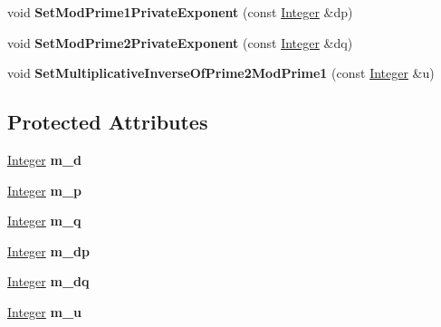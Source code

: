 \begin{DoxyCompactItemize}
\item 
\hypertarget{class_invertible_r_s_a_function_a5b01ca0407225d56dd1f06634d56e405}{
void {\bfseries SetModPrime1PrivateExponent} (const \hyperlink{class_integer}{Integer} \&dp)}
\label{class_invertible_r_s_a_function_a5b01ca0407225d56dd1f06634d56e405}

\item 
\hypertarget{class_invertible_r_s_a_function_a8c005d9809d47a63b1c2bb9d5ad5b88e}{
void {\bfseries SetModPrime2PrivateExponent} (const \hyperlink{class_integer}{Integer} \&dq)}
\label{class_invertible_r_s_a_function_a8c005d9809d47a63b1c2bb9d5ad5b88e}

\item 
\hypertarget{class_invertible_r_s_a_function_a6a4bd221c844168cecf50ef04cada713}{
void {\bfseries SetMultiplicativeInverseOfPrime2ModPrime1} (const \hyperlink{class_integer}{Integer} \&u)}
\label{class_invertible_r_s_a_function_a6a4bd221c844168cecf50ef04cada713}

\end{DoxyCompactItemize}
\subsection*{Protected Attributes}
\begin{DoxyCompactItemize}
\item 
\hypertarget{class_invertible_r_s_a_function_ae6ebef334123434c80fd0d87dddea8c7}{
\hyperlink{class_integer}{Integer} {\bfseries m\_\-d}}
\label{class_invertible_r_s_a_function_ae6ebef334123434c80fd0d87dddea8c7}

\item 
\hypertarget{class_invertible_r_s_a_function_a0061793214f56717f67956444c935cf9}{
\hyperlink{class_integer}{Integer} {\bfseries m\_\-p}}
\label{class_invertible_r_s_a_function_a0061793214f56717f67956444c935cf9}

\item 
\hypertarget{class_invertible_r_s_a_function_a48b1e3c5cf1ba5ba83952d46708afaee}{
\hyperlink{class_integer}{Integer} {\bfseries m\_\-q}}
\label{class_invertible_r_s_a_function_a48b1e3c5cf1ba5ba83952d46708afaee}

\item 
\hypertarget{class_invertible_r_s_a_function_a665927266b9a38963099529f720246ac}{
\hyperlink{class_integer}{Integer} {\bfseries m\_\-dp}}
\label{class_invertible_r_s_a_function_a665927266b9a38963099529f720246ac}

\item 
\hypertarget{class_invertible_r_s_a_function_a3702d3ea62a2edce11be04493e18a5a9}{
\hyperlink{class_integer}{Integer} {\bfseries m\_\-dq}}
\label{class_invertible_r_s_a_function_a3702d3ea62a2edce11be04493e18a5a9}

\item 
\hypertarget{class_invertible_r_s_a_function_a6b7b378c8be194a47faf824844ed6c7b}{
\hyperlink{class_integer}{Integer} {\bfseries m\_\-u}}
\label{class_invertible_r_s_a_function_a6b7b378c8be194a47faf824844ed6c7b}

\end{DoxyCompactItemize}


